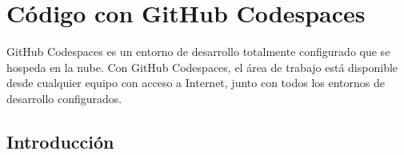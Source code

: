 \section{Código con GitHub Codespaces}

GitHub Codespaces es un entorno de desarrollo totalmente configurado que se hospeda en la nube. Con GitHub
Codespaces, el área de trabajo está disponible desde cualquier equipo con acceso a Internet, junto con 
todos los entornos de desarrollo configurados.

\subsection*{Introducción}
